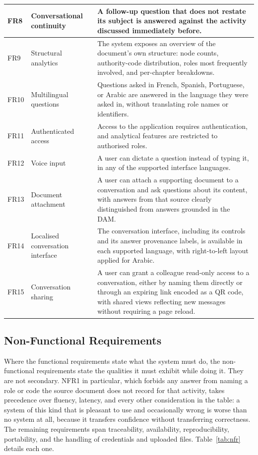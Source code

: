 \begin{longtable}{|p{}|p{}|p{}|}
FR8 & Conversational continuity & A follow-up question that does not restate its subject is answered against the activity discussed immediately before. \\ \hline
FR9 & Structural analytics & The system exposes an overview of the document's own structure: node counts, authority-code distribution, roles most frequently involved, and per-chapter breakdowns. \\ \hline
FR10 & Multilingual questions & Questions asked in French, Spanish, Portuguese, or Arabic are answered in the language they were asked in, without translating role names or identifiers. \\ \hline
FR11 & Authenticated access & Access to the application requires authentication, and analytical features are restricted to authorised roles. \\ \hline
FR12 & Voice input & A user can dictate a question instead of typing it, in any of the supported interface languages. \\ \hline
FR13 & Document attachment & A user can attach a supporting document to a conversation and ask questions about its content, with answers from that source clearly distinguished from answers grounded in the DAM. \\ \hline
FR14 & Localised conversation interface & The conversation interface, including its controls and its answer provenance labels, is available in each supported language, with right-to-left layout applied for Arabic. \\ \hline
FR15 & Conversation sharing & A user can grant a colleague read-only access to a conversation, either by naming them directly or through an expiring link encoded as a QR code, with shared views reflecting new messages without requiring a page reload. \\ \hline
\end{longtable}

\subsection{Non-Functional Requirements}

Where the functional requirements state what the system must do, the non-functional requirements state the qualities it must exhibit while doing it. They are not secondary. NFR1 in particular, which forbids any answer from naming a role or code the source document does not record for that activity, takes precedence over fluency, latency, and every other consideration in the table: a system of this kind that is pleasant to use and occasionally wrong is worse than no system at all, because it transfers confidence without transferring correctness. The remaining requirements span traceability, availability, reproducibility, portability, and the handling of credentials and uploaded files. Table~\ref{tab:nfr} details each one.


